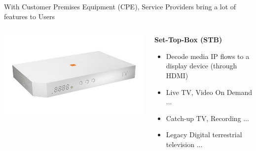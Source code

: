 \documentclass[a4paper]{beamer}
\begin{document}
\begin{frame}{With Customer Premises Equipment (CPE), Service Providers bring a lot of features to Users}
												
	\begin{columns}[T] 
		\begin{column}[T]{0.25 \textwidth} 
			\includegraphics[width=\linewidth]{liveboxdec.png}
		\end{column}
																										
		\begin{column}[T]{0.75 \textwidth} %
																																							
																																								   
			\textbf{ Set-Top-Box (STB)}
			\begin{itemize}
				\item Decode media IP flows to a display device (through HDMI)
				\item Live TV, Video On Demand ...
				\item Catch-up TV, Recording ...
				\item Legacy Digital terrestrial television ...
			\end{itemize}
																																								     
																																							
		\end{column}
																										
	\end{columns}
													
													
													
\end{frame}

\end{document}
